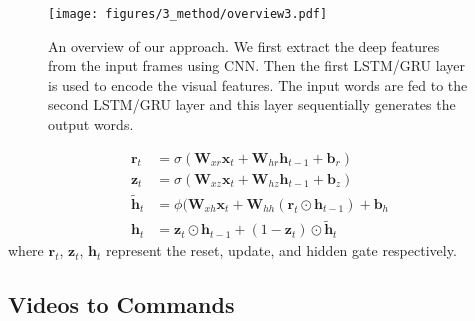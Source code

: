 \begin{figure*}[!htbp] 
    \centering

	\texttt{[image: figures/3\_method/overview3.pdf]} 
    \vspace{1.0ex}
    \caption{An overview of our approach. We first extract the deep features from the input frames using CNN. Then the first LSTM/GRU layer is used to encode the visual features. The input words are fed to the second LSTM/GRU layer and this layer sequentially generates the output words.}
    \label{Fig:overview} 
\end{figure*}


\begin{equation}
\label{Eq_GRU} 
\begin{aligned} 
{\mathbf{r}_t} &= \sigma ({\mathbf{W}_{xr}}{\mathbf{x}_t} + {\mathbf{W}_{hr}}{\mathbf{h}_{t - 1}} + {\mathbf{b}_r})\\
{\mathbf{z}_t} &= \sigma ({\mathbf{W}_{xz}}{\mathbf{x}_t} + {\mathbf{W}_{hz}}{\mathbf{h}_{t - 1}} + {\mathbf{b}_z})\\
{\mathbf{{\tilde h}}_t} &= \phi ({\mathbf{W}_{xh}}{\mathbf{x}_t} + {\mathbf{W}_{hh}}({\mathbf{r}_t} \odot {\mathbf{h}_{t - 1}}) + {\mathbf{b}_h}\\
{\mathbf{h}_t} &= {\mathbf{z}_t} \odot {\mathbf{h}_{t - 1}} + (1 - {\mathbf{z}_t}) \odot {\mathbf{{\tilde h}}_t}
\end{aligned}
\end{equation}
where $\mathbf{r}_t$, $\mathbf{z}_t$, $\mathbf{h}_t$ represent the reset, update, and hidden gate respectively.

\subsection{Videos to Commands}

